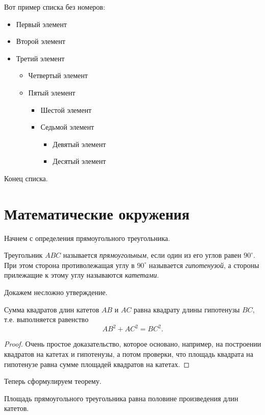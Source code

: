 \documentclass{cmcmsuthesis-phd}
\begin{document}
Вот пример списка без номеров:
\begin{itemize}
\item Первый элемент
\item Второй элемент
\item Третий элемент
\begin{itemize}
\item Четвертый элемент
\item Пятый элемент
\begin{itemize}
\item Шестой элемент
\item Седьмой элемент
\begin{itemize}
\item Девятый элемент
\item Десятый элемент
\end{itemize}
\end{itemize}
\end{itemize}
\end{itemize}
Конец списка.
\section{Математические окружения}
\label{sec:org5e318af}

Начнем с определения прямоугольного треугольника.

\begin{definition}\label{def:traingle1}
Треугольник \(ABC\) называется \emph{прямоугольным}, если один из его углов равен \(90^{\circ}\).
При этом сторона противолежащая углу в \(90^{\circ}\) называется \emph{гипотенузой}, а стороны прилежащие к этому углу называются \emph{катетами}.
\end{definition}

Докажем несложно утверждение.
\begin{proposition}\label{prop:triangle}
Сумма квадратов длин катетов \(AB\) и \(AC\) равна квадрату длины гипотенузы \(BC\), т.е. выполняется равенство
\[ AB^{2}+AC^{2} = BC^{2}. \]
\end{proposition}
\begin{proof}
Очень простое доказательство, которое основано, например, на построении квадратов на катетах и гипотенузы, а потом проверки, что площадь квадрата на гипотенузе равна сумме площадей квадратов на катетах.
\end{proof}

Теперь сформулируем теорему.
\begin{theorem}\label{thm:triangle}
Площадь прямоугольного треугольника равна половине произведения длин катетов.
\end{theorem}
\end{document}
